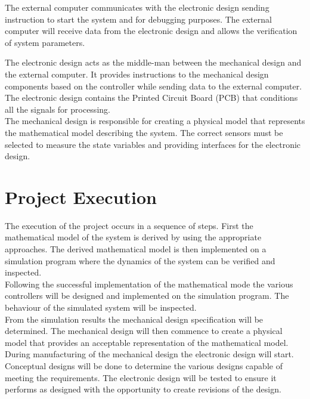 The external computer communicates with the electronic design sending instruction to start the system and for debugging purposes. The external computer will receive data from the electronic design and allows the verification of system parameters.

The electronic design acts as the middle-man between the mechanical design and the external computer. It provides instructions to the mechanical design components based on the controller while sending data to the external computer. The electronic design contains the Printed Circuit Board (PCB) that conditions all the signals for processing.\\

The mechanical design is responsible for creating a physical model that represents the mathematical model describing the system. The correct sensors must be selected to measure the state variables and providing interfaces for the electronic design.

\section{Project Execution}

The execution of the project occurs in a sequence of steps. First the mathematical model of the system is derived by using the appropriate approaches. The derived mathematical model is then implemented on a simulation program where the dynamics of the system can be verified and inspected.\\

Following the successful implementation of the mathematical mode the various controllers will be designed and implemented on the simulation program. The behaviour of the simulated system will be inspected.\\

From the simulation results the mechanical design specification will be determined. The mechanical design will then commence to create a physical model that provides an acceptable representation of the mathematical model.\\

During manufacturing of the mechanical design the electronic design will start. Conceptual designs will be done to determine the various designs capable of meeting the requirements. The electronic design will be tested to ensure it performs as designed with the opportunity to create revisions of the design.\\

